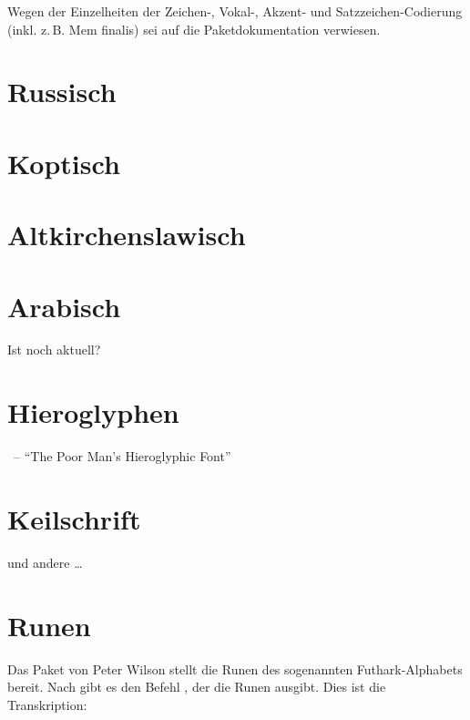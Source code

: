Wegen der Einzelheiten der Zeichen-, Vokal-, Akzent- und Satzzeichen-Codierung (inkl. z.\,B.
Mem finalis) sei auf die Paketdokumentation verwiesen.

\section{Russisch}

\section{Koptisch}

\section{Altkirchenslawisch}



\section{Arabisch}

Ist  noch aktuell?

\section{Hieroglyphen}

~-- \enquote{The Poor Man’s Hieroglyphic Font}




\section{Keilschrift}

 und andere \dots

\section{Runen}

Das Paket  von Peter Wilson stellt die Runen des sogenannten Futhark-Alphabets bereit.
Nach  gibt es den Befehl , der
die Runen ausgibt. Dies ist die Transkription:

